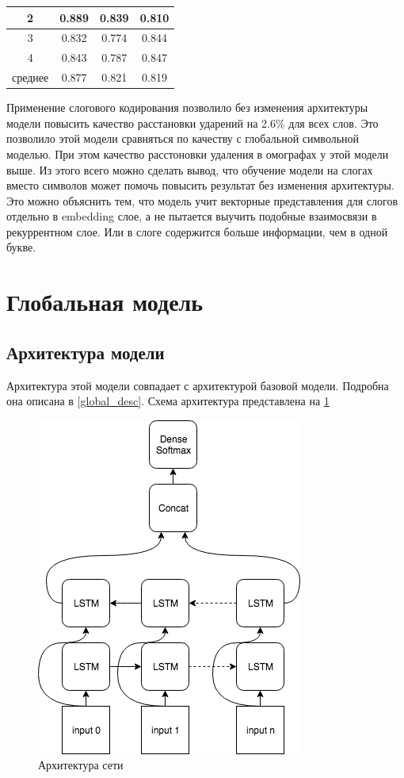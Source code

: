 \documentclass[14pt, a4paper, russian]{report}
\begin{document}
\begin{normalsize}
\begin{table}[H]
\begin{small}
\begin{center}
\begin{tabular}{|c|c|c|c|}
				     2       &      0.889      &      0.839       & 0.810             \\ \hline
				     3       &      0.832      &      0.774       & 0.844             \\ \hline
				     4       &      0.843      &      0.787       & 0.847             \\ \hline
				  среднее    &      0.877      &      0.821       & 0.819             \\ \hline
			\end{tabular}
		\end{center}
	\end{small}
	\label{table:local_syl}
\end{table}

Применение слогового кодирования позволило без изменения архитектуры модели повысить качество расстановки ударений на 2.6\% для всех слов. Это позволило этой модели сравняться по качеству с глобальной символьной моделью. При этом качество расстоновки удаления в омографах у этой модели выше. Из этого всего можно сделать вывод, что обучение модели на слогах вместо символов может помочь повысить результат  без изменения архитектуры. Это можно объяснить тем, что модель учит векторные представления для слогов отдельно в embedding слое, а не пытается выучить подобные взаимосвязи в рекуррентном слое. Или  в слоге содержится больше информации, чем в одной букве.

\section{Глобальная модель}
\subsection{Архитектура модели}
Архитектура этой модели совпадает с архитектурой базовой модели. Подробна она описана в \cref{global_desc}. 
Схема архитектура представлена на \cref{fig:base_global2}

\begin{figure}[H]
	\begin{center}
		\includegraphics[width=0.5\linewidth]{Baseline}
	\end{center}
	\caption{\small{Архитектура сети}}
	\label{fig:base_global2}
\end{figure}


\end{normalsize}
\end{document}
